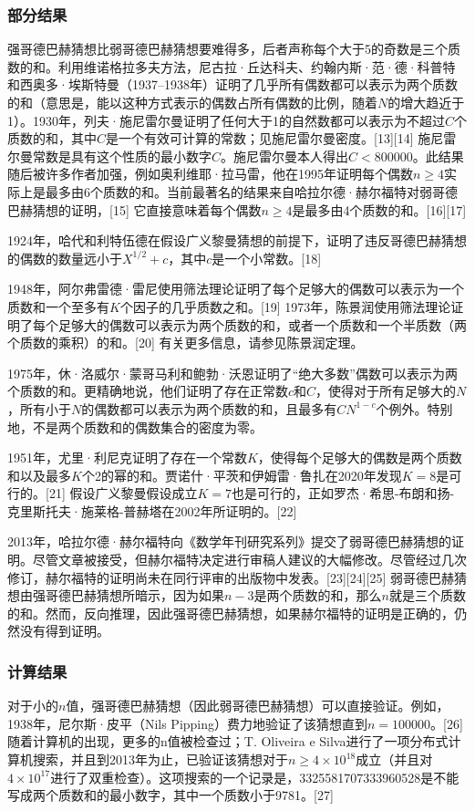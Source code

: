 \subsubsection{部分结果}  
强哥德巴赫猜想比弱哥德巴赫猜想要难得多，后者声称每个大于5的奇数是三个质数的和。利用维诺格拉多夫方法，尼古拉·丘达科夫、约翰内斯·范·德·科普特和西奥多·埃斯特曼（1937–1938年）证明了几乎所有偶数都可以表示为两个质数的和（意思是，能以这种方式表示的偶数占所有偶数的比例，随着\(N\)的增大趋近于1）。1930年，列夫·施尼雷尔曼证明了任何大于1的自然数都可以表示为不超过\(C\)个质数的和，其中\(C\)是一个有效可计算的常数；见施尼雷尔曼密度。[13][14] 施尼雷尔曼常数是具有这个性质的最小数字\(C\)。施尼雷尔曼本人得出\(C < 800000\)。此结果随后被许多作者加强，例如奥利维耶·拉马雷，他在1995年证明每个偶数\(n\ge4\)实际上是最多由6个质数的和。当前最著名的结果来自哈拉尔德·赫尔福特对弱哥德巴赫猜想的证明，[15] 它直接意味着每个偶数\(n\ge4\)是最多由4个质数的和。[16][17]

1924年，哈代和利特伍德在假设广义黎曼猜想的前提下，证明了违反哥德巴赫猜想的偶数的数量远小于\(X^{1/2}+ c\)，其中\(c\)是一个小常数。[18]

1948年，阿尔弗雷德·雷尼使用筛法理论证明了每个足够大的偶数可以表示为一个质数和一个至多有\(K\)个因子的几乎质数之和。[19] 1973年，陈景润使用筛法理论证明了每个足够大的偶数可以表示为两个质数的和，或者一个质数和一个半质数（两个质数的乘积）的和。[20] 有关更多信息，请参见陈景润定理。

1975年，休·洛威尔·蒙哥马利和鲍勃·沃恩证明了“绝大多数”偶数可以表示为两个质数的和。更精确地说，他们证明了存在正常数\(c\)和\(C\)，使得对于所有足够大的\(N\)，所有小于\(N\)的偶数都可以表示为两个质数的和，且最多有\(CN^{1-c}\)个例外。特别地，不是两个质数和的偶数集合的密度为零。

1951年，尤里·利尼克证明了存在一个常数\(K\)，使得每个足够大的偶数是两个质数和以及最多\(K\)个2的幂的和。贾诺什·平茨和伊姆雷·鲁扎在2020年发现\(K = 8\)是可行的。[21] 假设广义黎曼假设成立\(K = 7\)也是可行的，正如罗杰·希思-布朗和扬-克里斯托夫·施莱格-普赫塔在2002年所证明的。[22]

2013年，哈拉尔德·赫尔福特向《数学年刊研究系列》提交了弱哥德巴赫猜想的证明。尽管文章被接受，但赫尔福特决定进行审稿人建议的大幅修改。尽管经过几次修订，赫尔福特的证明尚未在同行评审的出版物中发表。[23][24][25] 弱哥德巴赫猜想由强哥德巴赫猜想所暗示，因为如果\(n-3\)是两个质数的和，那么\(n\)就是三个质数的和。然而，反向推理，因此强哥德巴赫猜想，如果赫尔福特的证明是正确的，仍然没有得到证明。
\subsubsection{计算结果}  
对于小的\(n\)值，强哥德巴赫猜想（因此弱哥德巴赫猜想）可以直接验证。例如，1938年，尼尔斯·皮平（Nils Pipping）费力地验证了该猜想直到\(n = 100000\)。[26] 随着计算机的出现，更多的n值被检查过；T. Oliveira e Silva进行了一项分布式计算机搜索，并且到2013年为止，已验证该猜想对于\(n\ge4\times10^{18}\)成立（并且对\(4\times10^{17}\)进行了双重检查）。这项搜索的一个记录是，3325581707333960528是不能写成两个质数和的最小数字，其中一个质数小于9781。[27]
